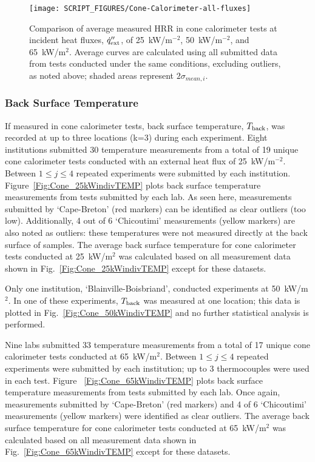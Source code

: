 \documentclass{book}
\begin{document}
\begin{figure}
  \centering
  \texttt{[image: SCRIPT\_FIGURES/Cone-Calorimeter-all-fluxes]}
  \caption{Comparison of average measured HRR in cone calorimeter tests at incident heat fluxes, $\dot{q}_{\rm ext}''$, of 25~kW/m$^{-2}$, 50~kW/m$^{-2}$, and 65~kW/m$^2$. Average curves are calculated using all submitted data from tests conducted under the same conditions, excluding outliers, as noted above; shaded areas represent $2\sigma_{mean,i}$.}
  \label{Fig:Cone-Calorimeter-all-fluxes}
\end{figure}

\newpage
\subsubsection{Back Surface Temperature}

If measured in cone calorimeter tests, back surface temperature, $T_{\rm back}$, was recorded at up to three locations (k=3) during each experiment. Eight institutions submitted 30 temperature measurements from a total of 19 unique cone calorimeter tests conducted with an external heat flux of 25~kW/m$^{-2}$. Between $1\le j\le4$ repeated experiments were submitted by each institution.  Figure~\ref{Fig:Cone_25kWindivTEMP} plots back surface temperature measurements from tests submitted by each lab. As seen here, measurements submitted by ‘Cape-Breton’ (red markers) can be identified as clear outliers (too low). Additionally, 4 out of 6 ‘Chicoutimi’ measurements (yellow markers) are also noted as outliers: these temperatures were not measured directly at the back surface of samples. The average back surface temperature for cone calorimeter tests conducted at 25~kW/m$^2$ was calculated based on all measurement data shown in Fig.~\ref{Fig:Cone_25kWindivTEMP} except for these datasets.

Only one institution, ‘Blainville-Boisbriand’, conducted experiments at 50~kW/m$^2$. In one of these experiments, $T_{\rm back}$ was measured at one location; this data is plotted in Fig.~\ref{Fig:Cone_50kWindivTEMP} and no further statistical analysis is performed.

Nine labs submitted 33 temperature measurements from a total of 17 unique cone calorimeter tests conducted at 65~kW/m$^2$. Between $1\le j\le4$ repeated experiments were submitted by each institution; up to 3 thermocouples were used in each test. Figure ~\ref{Fig:Cone_65kWindivTEMP} plots back surface temperature measurements from tests submitted by each lab. Once again, measurements  submitted by ‘Cape-Breton’ (red markers) and 4 of 6 ‘Chicoutimi’ measurements (yellow markers) were identified as clear outliers. The average back surface temperature for cone calorimeter tests conducted at 65~kW/m$^2$ was calculated based on all measurement data shown in Fig.~\ref{Fig:Cone_65kWindivTEMP} except for these datasets.
\end{document}
